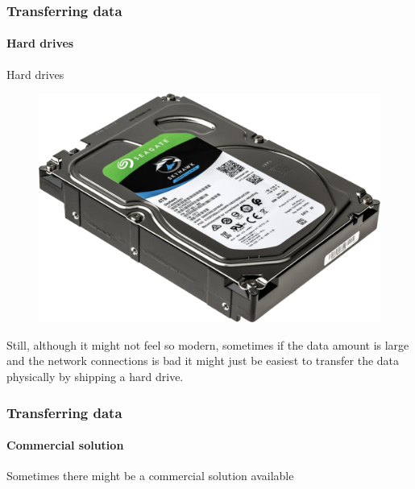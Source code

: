 \documentclass[aspectratio=169,dvipsnames]{beamer}
\begin{document}
    \begin{frame}
        \frametitle{Transferring data}
        \framesubtitle{Hard drives}
        \begin{block}{Hard drives}
        \begin{figure}
        \vspace{-1\baselineskip}
        \includegraphics[width=0.6\linewidth]{Figures/harddrive.png}
        \end{figure}
           Still, although it might not feel so modern, sometimes \alert{if the data
           amount is large} and the \alert{network connections is bad} it might just be
           easiest to transfer the data physically by \alert{shipping a hard drive}.
        \end{block}
    \end{frame}
    \begin{frame}
        \frametitle{Transferring data}
        \framesubtitle{Commercial solution}
        \begin{center}
            Sometimes there might be a commercial solution available
        \end{center}
    \end{frame}
\end{document}
